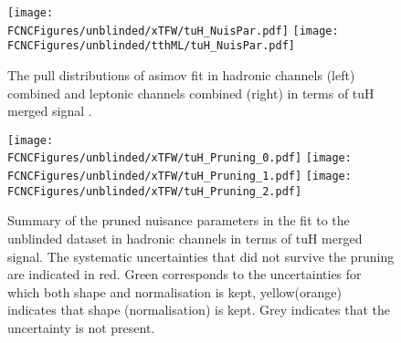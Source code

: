 








\begin{figure}[htb]
\centering
\texttt{[image: \\FCNCFigures/unblinded/xTFW/tuH\_NuisPar.pdf]}
\texttt{[image: \\FCNCFigures/unblinded/tthML/tuH\_NuisPar.pdf]}
\caption{ The pull distributions of asimov fit in hadronic channels (left) combined and leptonic channels combined (right) in terms of tuH merged signal . }
\label{fig:fcnc_pull_data}
\end{figure}


\begin{figure}[htb]
\centering
\texttt{[image: \\FCNCFigures/unblinded/xTFW/tuH\_Pruning\_0.pdf]}
\texttt{[image: \\FCNCFigures/unblinded/xTFW/tuH\_Pruning\_1.pdf]}
\texttt{[image: \\FCNCFigures/unblinded/xTFW/tuH\_Pruning\_2.pdf]}
\caption{ Summary of the pruned nuisance parameters in the fit to the unblinded dataset in hadronic channels in terms of tuH merged signal. The systematic uncertainties that did not survive the pruning are indicated in red. Green corresponds to the uncertainties for which both shape and normalisation is kept, yellow(orange) indicates that shape (normalisation) is kept. Grey indicates that the uncertainty is not present.}
\label{fig:xTFW_pruning_0}
\end{figure}


